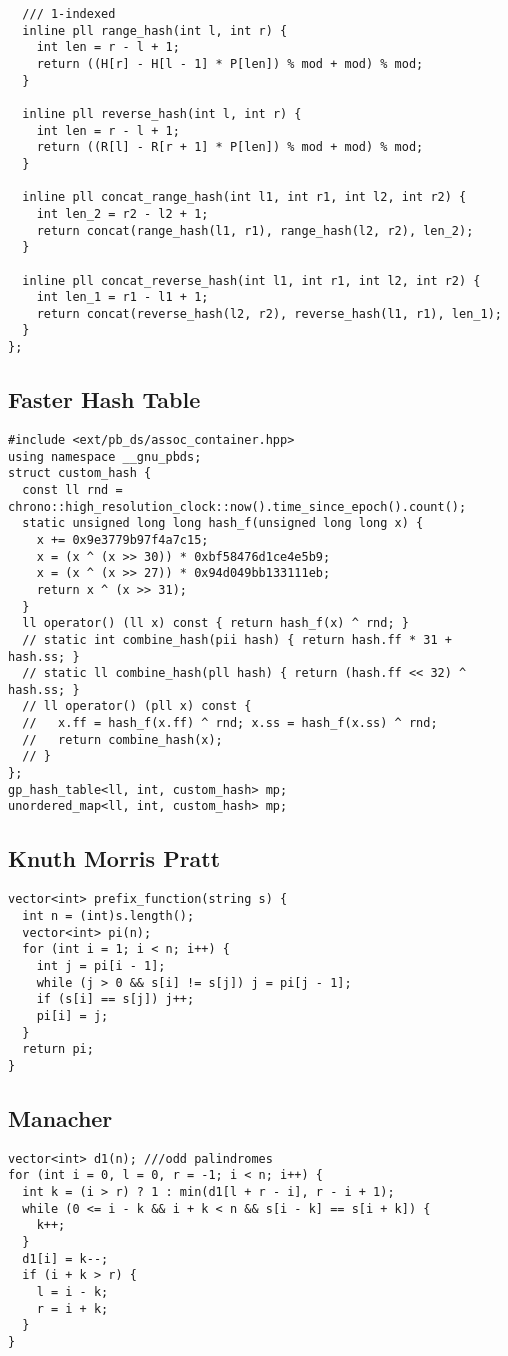 \documentclass[10pt,a4paper,onesided]{article}
\begin{document}
\begin{multicols*}{3}
\begin{lstlisting}
  /// 1-indexed
  inline pll range_hash(int l, int r) {
    int len = r - l + 1;
    return ((H[r] - H[l - 1] * P[len]) % mod + mod) % mod;
  }

  inline pll reverse_hash(int l, int r) {
    int len = r - l + 1;
    return ((R[l] - R[r + 1] * P[len]) % mod + mod) % mod;
  }

  inline pll concat_range_hash(int l1, int r1, int l2, int r2) {
    int len_2 = r2 - l2 + 1;
    return concat(range_hash(l1, r1), range_hash(l2, r2), len_2);
  }

  inline pll concat_reverse_hash(int l1, int r1, int l2, int r2) {
    int len_1 = r1 - l1 + 1;
    return concat(reverse_hash(l2, r2), reverse_hash(l1, r1), len_1);
  }
};
\end{lstlisting}
\subsection{Faster Hash Table}
\begin{lstlisting}
#include <ext/pb_ds/assoc_container.hpp>
using namespace __gnu_pbds;
struct custom_hash {
  const ll rnd = chrono::high_resolution_clock::now().time_since_epoch().count();
  static unsigned long long hash_f(unsigned long long x) {
    x += 0x9e3779b97f4a7c15;
    x = (x ^ (x >> 30)) * 0xbf58476d1ce4e5b9;
    x = (x ^ (x >> 27)) * 0x94d049bb133111eb;
    return x ^ (x >> 31);
  }
  ll operator() (ll x) const { return hash_f(x) ^ rnd; }
  // static int combine_hash(pii hash) { return hash.ff * 31 + hash.ss; }
  // static ll combine_hash(pll hash) { return (hash.ff << 32) ^ hash.ss; }
  // ll operator() (pll x) const { 
  //   x.ff = hash_f(x.ff) ^ rnd; x.ss = hash_f(x.ss) ^ rnd;
  //   return combine_hash(x); 
  // }
};
gp_hash_table<ll, int, custom_hash> mp;
unordered_map<ll, int, custom_hash> mp;
\end{lstlisting}
\subsection{Knuth Morris Pratt}
\begin{lstlisting}
vector<int> prefix_function(string s) {
  int n = (int)s.length();
  vector<int> pi(n);
  for (int i = 1; i < n; i++) {
    int j = pi[i - 1];
    while (j > 0 && s[i] != s[j]) j = pi[j - 1];
    if (s[i] == s[j]) j++;
    pi[i] = j;
  }
  return pi;
}
\end{lstlisting}
\subsection{Manacher}
\begin{lstlisting}
vector<int> d1(n); ///odd palindromes
for (int i = 0, l = 0, r = -1; i < n; i++) {
  int k = (i > r) ? 1 : min(d1[l + r - i], r - i + 1);
  while (0 <= i - k && i + k < n && s[i - k] == s[i + k]) {
    k++;
  }
  d1[i] = k--;
  if (i + k > r) {
    l = i - k;
    r = i + k;
  }
}


\end{lstlisting}
\end{multicols*}
\end{document}
